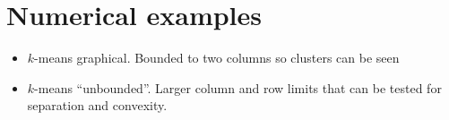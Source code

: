 \section{Numerical examples}\label{section:examples}

\begin{itemize}
    \item \(k\)-means graphical. Bounded to two columns so clusters can be seen
    \item \(k\)-means ``unbounded''. Larger column and row limits that can be
        tested for separation and convexity.
\end{itemize}
